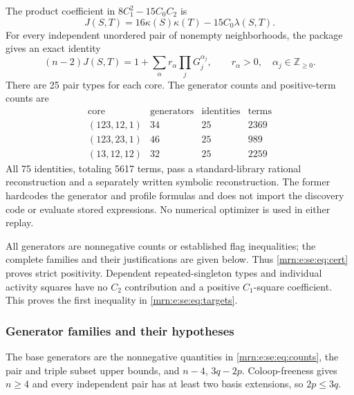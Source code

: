 \documentclass[11pt,a4paper]{article}
\theoremstyle{remark}\newtheorem{remark}[theorem]{Remark}
\begin{document}
The product coefficient in $8C_1^2-15C_0C_2$ is
\[
 J(S,T)=16\kappa(S)\kappa(T)-15C_0\lambda(S,T).
\]
For every independent unordered pair of nonempty neighborhoods, the package gives an exact identity
\begin{equation}\label{mrn:e:se:eq:cert}
 (n-2)J(S,T)=1+\sum_\alpha r_\alpha\prod_jG_j^{\alpha_j},
 \qquad r_\alpha>0,\quad\alpha_j\in\mathbb Z_{\ge0}.
\end{equation}
There are 25 pair types for each core. The generator counts and positive-term counts are
\[
 \begin{array}{c|r|r|r}
 \text{core}&\text{generators}&\text{identities}&\text{terms}\\\hline
 (123,12,1)&34&25&2369\\
 (123,23,1)&46&25&989\\
 (13,12,12)&32&25&2259
 \end{array}
\]
All 75 identities, totaling 5617 terms, pass a standard-library rational reconstruction and a separately written symbolic reconstruction. The former hardcodes the generator and profile formulas and does not import the discovery code or evaluate stored expressions. No numerical optimizer is used in either replay.

All generators are nonnegative counts or established flag inequalities; the complete families and their justifications are given below. Thus \eqref{mrn:e:se:eq:cert} proves strict positivity. Dependent repeated-singleton types and individual activity squares have no $C_2$ contribution and a positive $C_1$-square coefficient. This proves the first inequality in \eqref{mrn:e:se:eq:targets}.

\subsubsection{Generator families and their hypotheses}
The base generators are the nonnegative quantities in \eqref{mrn:e:se:eq:counts}, the pair and triple subset upper bounds, and $n-4$, $3q-2p$. Coloop-freeness gives $n\ge4$ and every independent pair has at least two basis extensions, so $2p\le3q$.
\end{document}
